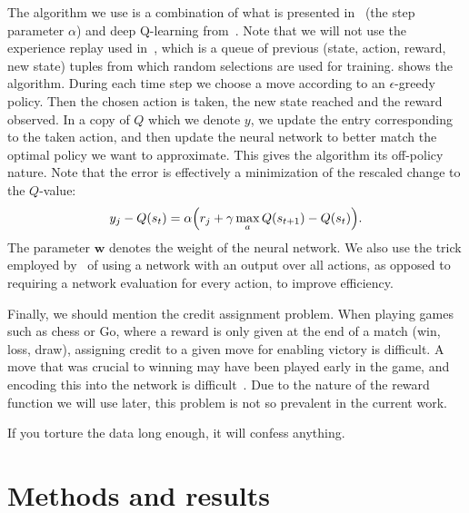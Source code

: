 \documentclass[11pt, a4paper]{report} %
\begin{document}
The algorithm we use is a combination of what is presented in~\cite{Sutton} (the step parameter \(\alpha\)) and deep Q-learning from~\cite{mnih13_playin_atari_with_deep_reinf_learn}.
Note that we will not use the experience replay used in~\cite{mnih13_playin_atari_with_deep_reinf_learn}, which is a queue of previous (state, action, reward, new state) tuples from which random selections are used for training.
 shows the algorithm.
During each time step we choose a move according to an \(\epsilon\)-greedy policy.
Then the chosen action is taken, the new state reached and the reward observed.
In a copy of \(Q\) which we denote \(y\), we update the entry corresponding to the taken action, and then update the neural network to better match the optimal policy we want to approximate.
This gives the algorithm its off-policy nature.
Note that the error is effectively a minimization of the rescaled change to the \(Q\)-value:
\begin{align}
  \label{eq:73}
  y_j - Q(s_t) = \alpha \qty(r_j + \gamma \max_a Q(s_{t+1}) - Q(s_t)).
\end{align}
The parameter \(\mathbf{w}\) denotes the weight of the neural network.
We also use the trick employed by~\cite{mnih13_playin_atari_with_deep_reinf_learn} of using a network with an output over all actions, as opposed to requiring a network evaluation for every action, to improve efficiency.



Finally, we should mention the credit assignment problem.
When playing games such as chess or Go, where a reward is only given at the end of a match (win, loss, draw), assigning credit to a given move for enabling victory is difficult.
A move that was crucial to winning may have been played early in the game, and encoding this into the network is difficult~\cite{Sutton}.
Due to the nature of the reward function we will use later, this problem is not so prevalent in the current work.






\begin{savequote}[50mm]
If you torture the data long enough, it will confess anything.
\end{savequote}

\chapter{Methods and results}\label{chap:results}
\end{document}
